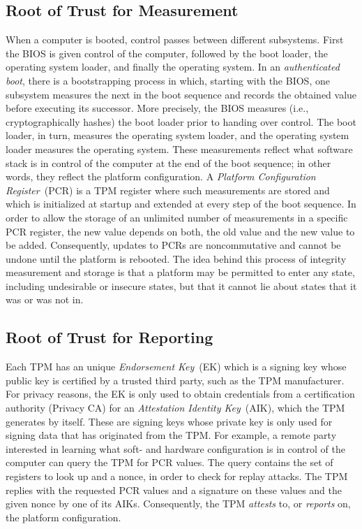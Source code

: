 \documentclass[runningheads]{llncs}
\begin{document}
\subsection{Root of Trust for Measurement}
When a computer is booted, control passes between different subsystems. First
the BIOS is given control of the computer, followed by the boot loader, the
operating system loader, and finally the operating system. In an
\emph{authenticated boot}, there is a bootstrapping process in which, starting
with the BIOS, one subsystem measures the next in the boot sequence and records
the obtained value before executing its successor. More precisely, the BIOS
measures (i.e., cryptographically hashes) the boot loader prior to handing
over control. The boot loader, in turn, measures the operating system loader,
and the operating system loader measures the operating system.
These measurements reflect what software stack is in control of the computer
at the end of the boot sequence; in other words, they reflect the platform
configuration. A \emph{Platform Configuration Register}~(PCR) is a TPM
register where such measurements are stored and which is initialized at
startup and extended at every step of the boot sequence. In order to allow
the storage of an unlimited number of measurements in a specific PCR register,
the new value depends on both, the old value and the new value to be added.
Consequently, updates to PCRs are noncommutative and cannot be undone until
the platform is rebooted. The idea behind this process of integrity measurement
and storage is that a platform may be permitted to enter any state, including
undesirable or insecure states, but that it cannot lie about states that it
was or was not in.

\subsection{Root of Trust for Reporting}
Each TPM has an unique \emph{Endorsement Key}~(EK) which is a signing key
whose public key is certified by a trusted third party, such as the TPM
manufacturer. For privacy reasons, the EK is only used to obtain credentials
from a certification authority (Privacy CA) for an \emph{Attestation Identity
Key}~(AIK), which the TPM generates by itself.
These are signing keys whose private key is only used for signing data that
has originated from the TPM. For example, a remote party interested in
learning what soft- and hardware configuration is in control of the computer
can query the TPM for PCR values. The query contains the set of registers to
look up and a nonce, in order to check for replay attacks.
The TPM replies with the requested PCR values and a signature on these values
and the given nonce by one of its AIKs. Consequently, the TPM \emph{attests}
to, or \emph{reports} on, the platform configuration.
\end{document}
